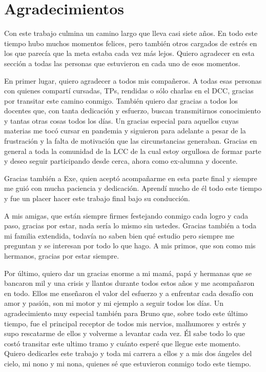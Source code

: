 \chapter*{Agradecimientos}

Con este trabajo culmina un camino largo que lleva casi siete años. En todo este tiempo hubo muchos momentos felices, pero también otros cargados de estrés en los que parecía que la meta estaba cada vez más lejos. Quiero agradecer en esta sección a todas las personas que estuvieron en cada uno de esos momentos. 

En primer lugar, quiero agradecer a todos mis compañeros. A todas esas personas con quienes compartí cursadas, TPs, rendidas o sólo charlas en el DCC, gracias por transitar este camino conmigo. También quiero dar gracias a todos los docentes que, con tanta dedicación y esfuerzo, buscan transmitirnos conocimiento y tantas otras cosas todos los días. Un gracias especial para aquellos cuyas materias me tocó cursar en pandemia y siguieron para adelante a pesar de la frustración y la falta de motivación que las circunstancias generaban. Gracias en general a toda la comunidad de la LCC de la cual estoy orgullosa de formar parte y deseo seguir participando desde cerca, ahora como ex-alumna y docente.

Gracias también a Exe, quien aceptó acompañarme en esta parte final y siempre me guió con mucha paciencia y dedicación. Aprendí mucho de él todo este tiempo y fue un placer hacer este trabajo final bajo su conducción.

A mis amigas, que están siempre firmes festejando conmigo cada logro y cada paso, gracias por estar, nada sería lo mismo sin ustedes. Gracias también a toda mi familia extendida, todavía no saben bien qué estudio pero siempre me preguntan y se interesan por todo lo que hago. A mis primos, que son como mis hermanos, gracias por estar siempre. 

Por último, quiero dar un gracias enorme a mi mamá, papá y hermanas que se bancaron mil y una crisis y llantos durante todos estos años y me acompañaron en todo. Ellos me enseñaron el valor del esfuerzo y a enfrentar cada desafío con amor y pasión, son mi motor y mi ejemplo a seguir todos los días. Un agradecimiento muy especial también para Bruno que, sobre todo este último tiempo, fue el principal receptor de todos mis nervios, malhumores y estrés y supo rescatarme de ellos y volverme a levantar cada vez. Él sabe todo lo que costó transitar este ultimo tramo y cuánto esperé que llegue este momento. Quiero dedicarles este trabajo y toda mi carrera a ellos y a mis dos ángeles del cielo, mi nono y mi nona, quienes sé que estuvieron conmigo todo este tiempo.

 

 
